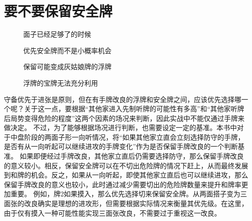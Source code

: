 \section{要不要保留安全牌}
\begin{figure}[h]
    \caption{面子已经足够了的时候}
    \label{lec8:pai1-2}
    \par\bigskip
\end{figure}
\begin{figure}[h]
    \caption{优先安全牌而不是小概率机会}
    \label{lec8:pai3}
\end{figure}
\begin{figure}[h]
    \caption{保留可能变成灰姑娘牌的浮牌}
    \label{lec8:pai4}
\end{figure}
\begin{figure}[h]
    \caption{浮牌的宝牌无法充分利用}
    \label{lec8:pai5}
\end{figure}

守备优先于进张是原则，但在有手牌改良的浮牌和安全牌之间，应该优先选择哪一个呢？关于这一点，要根据“其他家进入先制听牌的可能性有多高”和“其他家听牌后局势变得危险的程度”这两个因素的场况来判断，因此实战中不能仅通过手牌来做决定。
不过，为了能够根据场况进行判断，也需要设定一定的基准。本书中对于中盘阶段的两面子形一向听情况，将“如果其他家立直会立刻选择防守的手牌，是否有从一向听起可以继续进攻的手牌变化”作为是否保留手牌改良的一个判断基准。
如果即便经过手牌改良，其他家立直后仍需要选择防守，那么保留手牌改良的意义较小。相反，保留安全牌可以在不切出危险牌的情况下赶上，从而最终发展到和牌的机会。反之，如果从一向听起，即使其他家立直后也可以继续进攻，那么保留手牌改良的意义也较小，此时通过减少需要切出的危险牌数量来提升和牌率更加重要。
例如，牌2如果摸入，那么优先选择切来保留安全牌。从两面搭子变为三面张的改良确实是理想的进攻形，但需要根据实际情况来衡量其优先级。在这里，由于仅有摸入一种可能性能实现三面张改良，不需要过于重视这一改良。